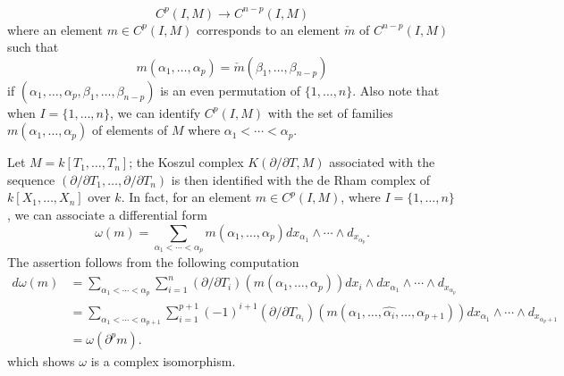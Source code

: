 \[C^p(I,M)\to C^{n-p}(I,M)\]
where an element $m\in C^p(I,M)$ corresponds to an element $\check{m}$ of $C^{n-p}(I,M)$ such that
\[m(\alpha_1,\dots,\alpha_p)=\check{m}(\beta_1,\dots,\beta_{n-p})\]
if $(\alpha_1,\dots,\alpha_p,\beta_1,\dots,\beta_{n-p})$ is an even permutation of $\{1,\dots,n\}$. Also note that when $I=\{1,\dots,n\}$, we can identify $C^p(I,M)$ with the set of families $m(\alpha_1,\dots,\alpha_p)$ of elements of $M$ where $\alpha_1<\cdots<\alpha_p$.
\begin{example}\label{Koszul complex and de Rham complex for polynomial ring}
Let $M=k[T_1,\dots,T_n]$; the Koszul complex $K(\partial/\partial T,M)$ associated with the sequence $(\partial/\partial T_1,\dots,\partial/\partial T_n)$ is then identified with the de Rham complex of $k[X_1,\dots,X_n]$ over $k$. In fact, for an element $m\in C^p(I,M)$, where $I=\{1,\dots,n\}$, we can associate a differential form
\[\omega(m)=\sum_{\alpha_1<\cdots<\alpha_p}m(\alpha_1,\dots,\alpha_p)dx_{\alpha_1}\wedge\cdots\wedge d_{x_{\alpha_p}}.\]
The assertion follows from the following computation
\begin{align*}
d\omega(m)&=\sum_{\alpha_1<\cdots<\alpha_p}\sum_{i=1}^{n}(\partial/\partial T_i)(m(\alpha_1,\dots,\alpha_p))dx_i\wedge dx_{\alpha_1}\wedge\cdots\wedge d_{x_{\alpha_p}}\\
&=\sum_{\alpha_1<\cdots<\alpha_{p+1}}\sum_{i=1}^{p+1}(-1)^{i+1}(\partial/\partial T_{\alpha_i})(m(\alpha_1,\dots,\widehat{\alpha_i},\dots,\alpha_{p+1}))dx_{\alpha_1}\wedge\cdots\wedge d_{x_{\alpha_p+1}}\\
&=\omega(\partial^pm).
\end{align*}
which shows $\omega$ is a complex isomorphism.
\end{example}
